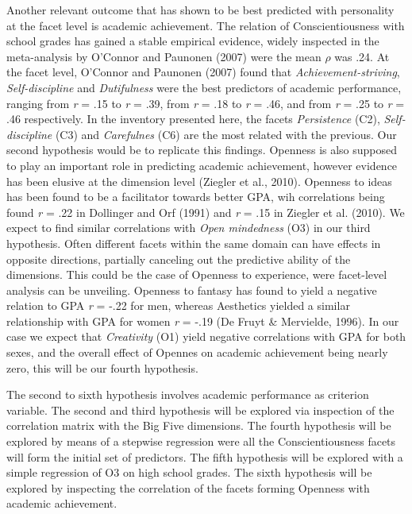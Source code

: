\documentclass[,man,floatsintext]{apa6}
\begin{document}
Another relevant outcome that has shown to be best predicted with
personality at the facet level is academic achievement. The relation of
Conscientiousness with school grades has gained a stable empirical
evidence, widely inspected in the meta-analysis by O'Connor and Paunonen
(2007) were the mean \(\rho\) was .24. At the facet level, O'Connor and
Paunonen (2007) found that \emph{Achievement-striving},
\emph{Self-discipline} and \emph{Dutifulness} were the best predictors
of academic performance, ranging from \emph{r} = .15 to \emph{r} = .39,
from \emph{r} = .18 to \emph{r} = .46, and from \emph{r} = .25 to
\emph{r} = .46 respectively. In the inventory presented here, the facets
\emph{Persistence} (C2), \emph{Self-discipline} (C3) and
\emph{Carefulnes} (C6) are the most related with the previous. Our
second hypothesis would be to replicate this findings. Openness is also
supposed to play an important role in predicting academic achievement,
however evidence has been elusive at the dimension level (Ziegler et
al., 2010). Openness to ideas has been found to be a facilitator towards
better GPA, wih correlations being found \emph{r} = .22 in Dollinger and
Orf (1991) and \emph{r} = .15 in Ziegler et al. (2010). We expect to
find similar correlations with \emph{Open mindedness} (O3) in our third
hypothesis. Often different facets within the same domain can have
effects in opposite directions, partially canceling out the predictive
ability of the dimensions. This could be the case of Openness to
experience, were facet-level analysis can be unveiling. Openness to
fantasy has found to yield a negative relation to GPA \emph{r} = -.22
for men, whereas Aesthetics yielded a similar relationship with GPA for
women \emph{r} = -.19 (De Fruyt \& Mervielde, 1996). In our case we
expect that \emph{Creativity} (O1) yield negative correlations with GPA
for both sexes, and the overall effect of Opennes on academic
achievement being nearly zero, this will be our fourth hypothesis.

The second to sixth hypothesis involves academic performance as
criterion variable. The second and third hypothesis will be explored via
inspection of the correlation matrix with the Big Five dimensions. The
fourth hypothesis will be explored by means of a stepwise regression
were all the Conscientiousness facets will form the initial set of
predictors. The fifth hypothesis will be explored with a simple
regression of O3 on high school grades. The sixth hypothesis will be
explored by inspecting the correlation of the facets forming Openness
with academic achievement.
\end{document}
